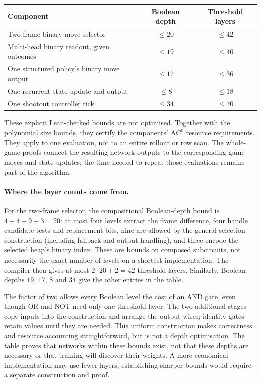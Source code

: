 \documentclass[11pt]{article}
\newcommand{\AC}{\mathrm{AC}}
\theoremstyle{plain}
\theoremstyle{definition}
\theoremstyle{remark}
\numberwithin{equation}{section}
\begin{document}
\begin{center}
\begin{tabular}{lcc}
\hline
\textbf{Component} & \textbf{Boolean depth} & \textbf{Threshold layers} \\
\hline
Two-frame binary move selector & $\le20$ & $\le42$ \\
Multi-head binary readout, given outcomes & $\le19$ & $\le40$ \\
One structured policy's binary move output & $\le17$ & $\le36$ \\
One recurrent state update and output & $\le8$ & $\le18$ \\
One shootout controller tick & $\le34$ & $\le70$ \\
\hline
\end{tabular}
\end{center}
These explicit Lean-checked bounds are not optimised. Together with the polynomial size bounds, they certify the components' $\AC^0$ resource requirements. They apply to one evaluation, not to an entire rollout or row scan. The whole-game proofs connect the resulting network outputs to the corresponding game moves and state updates; the time needed to repeat those evaluations remains part of the algorithm.

\paragraph{Where the layer counts come from.}
\label{par:depth-accounting}
For the two-frame selector, the compositional Boolean-depth bound is $4+4+9+3=20$: at most four levels extract the frame difference, four handle candidate tests and replacement bits, nine are allowed by the general selection construction (including fallback and output handling), and three encode the selected heap's binary index. These are bounds on composed subcircuits, not necessarily the exact number of levels on a shortest implementation. The compiler then gives at most $2\cdot20+2=42$ threshold layers. Similarly, Boolean depths $19$, $17$, $8$ and $34$ give the other entries in the table.

The factor of two allows every Boolean level the cost of an AND gate, even though OR and NOT need only one threshold layer. The two additional stages copy inputs into the construction and arrange the output wires; identity gates retain values until they are needed. This uniform construction makes correctness and resource accounting straightforward, but is not a depth optimisation. The table proves that networks within these bounds exist, not that these depths are necessary or that training will discover their weights. A more economical implementation may use fewer layers; establishing sharper bounds would require a separate construction and proof.
\end{document}
